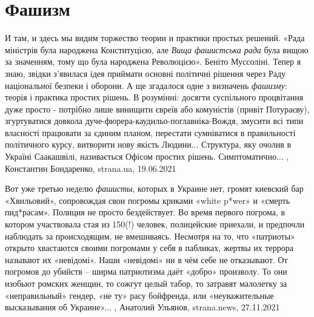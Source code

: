  
 
 
 
 
\chapter{Фашизм}
\label{sec:slova.fashizm}

И там, и здесь мы видим торжество теории и практики простых решений. «Рада
міністрів була народжена Конституцією, але \emph{Вища фашистська рада} була
вищою за значенням, тому що була народжена Революцією». Беніто Муссоліні.
Тепер я знаю, звідки з'явилася ідея приймати основні політичні рішення через
Раду національної безпеки і оборони.  А ще згадалося одне з визначень
\emph{фашизму}: теорія і практика простих рішень. В розумінні: досягти
суспільного процвітання дуже просто - потрібно лише винищити євреїв або
комуністів (привіт Потураєву), згуртуватися довкола
дуче-фюрера-каудильо-поглавніка-Вождя, змусити всі типи власності працювати за
єдиним планом, перестати сумніватися в правильності політичного курсу,
витворити нову якість Людини... Структура, яку очолив в Україні Саакашвілі,
називається Офісом простих рішень. Симптоматично...
, 
Константин Бондаренко, strana.ua, 19.06.2021

Вот уже третью неделю \emph{фашисты}, которых в Украине нет, громят киевский бар
«Хвильовий», сопровождая свои погромы криками «white p*wer» и «смерть
пид*расам».  Полиция не просто бездействует. Во время первого погрома, в
котором участвовала стая из 150(!) человек, полицейские приехали, и предпочли
наблюдать за происходящим, не вмешиваясь.  Несмотря на то, что «патриоты»
открыто хвастаются своими погромами у себя в пабликах, жертвы их террора
называют их «невідомі».  Наши «невідомі» ни в чём себе не отказывают. От
погромов до убийств – ширма патриотизма даёт «добро» произволу. То они изобьют
ромских женщин, то сожгут целый табор, то затравят малолетку за «неправильный»
гендер, «не ту» расу бойфренда, или «неуважительные высказывания об Украине»...
, 
Анатолий Ульянов, strana.news, 27.11.2021
